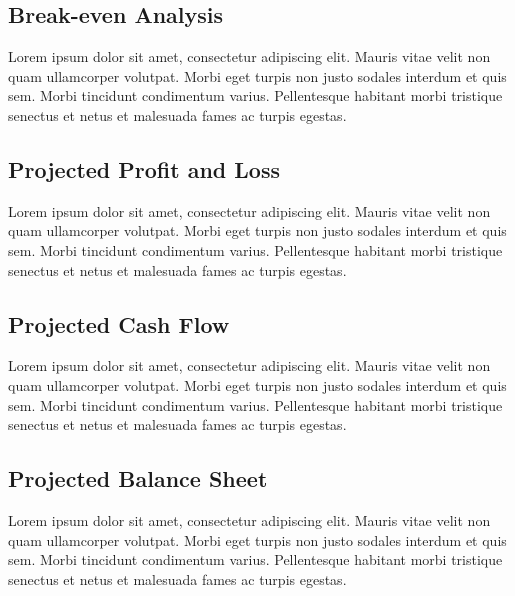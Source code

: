 \documentclass[11pt,titlepage]{article}
\begin{document}
\subsection{Break-even Analysis}
Lorem ipsum dolor sit amet, consectetur adipiscing elit. Mauris vitae velit 
non quam ullamcorper volutpat. Morbi eget turpis non justo sodales interdum 
et quis sem. Morbi tincidunt condimentum varius. Pellentesque habitant morbi 
tristique senectus et netus et malesuada fames ac turpis egestas.\newline

\subsection{Projected Profit and Loss}
Lorem ipsum dolor sit amet, consectetur adipiscing elit. Mauris vitae velit 
non quam ullamcorper volutpat. Morbi eget turpis non justo sodales interdum 
et quis sem. Morbi tincidunt condimentum varius. Pellentesque habitant morbi 
tristique senectus et netus et malesuada fames ac turpis egestas.\newline

\subsection{Projected Cash Flow}
Lorem ipsum dolor sit amet, consectetur adipiscing elit. Mauris vitae velit 
non quam ullamcorper volutpat. Morbi eget turpis non justo sodales interdum 
et quis sem. Morbi tincidunt condimentum varius. Pellentesque habitant morbi 
tristique senectus et netus et malesuada fames ac turpis egestas.\newline

\subsection{Projected Balance Sheet}
Lorem ipsum dolor sit amet, consectetur adipiscing elit. Mauris vitae velit 
non quam ullamcorper volutpat. Morbi eget turpis non justo sodales interdum 
et quis sem. Morbi tincidunt condimentum varius. Pellentesque habitant morbi 
tristique senectus et netus et malesuada fames ac turpis egestas.\newline
\end{document}
